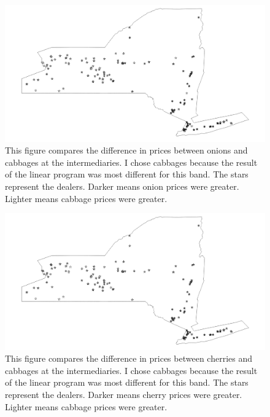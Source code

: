\documentclass{report}
\begin{document}

\begin{figure}
\centering
\begin{framed}
\includegraphics[scale=.50]{procs_243_49}
\caption{This figure compares the difference in prices between onions and cabbages at the intermediaries. I chose cabbages because the result of the linear program was most different for this band. The stars represent the dealers. Darker means onion prices were greater. Lighter means cabbage prices were greater.}
\label{fig:procs_243_49}
\end{framed}
\end{figure}

\begin{figure}
\centering
\begin{framed}
\includegraphics[scale=.50]{procs_243_66}
\caption{This figure compares the difference in prices between cherries and cabbages at the intermediaries. I chose cabbages because the result of the linear program was most different for this band. The stars represent the dealers. Darker means cherry prices were greater. Lighter means cabbage prices were greater.}
\label{fig:procs_243_66}
\end{framed}
\end{figure}
\end{document}
